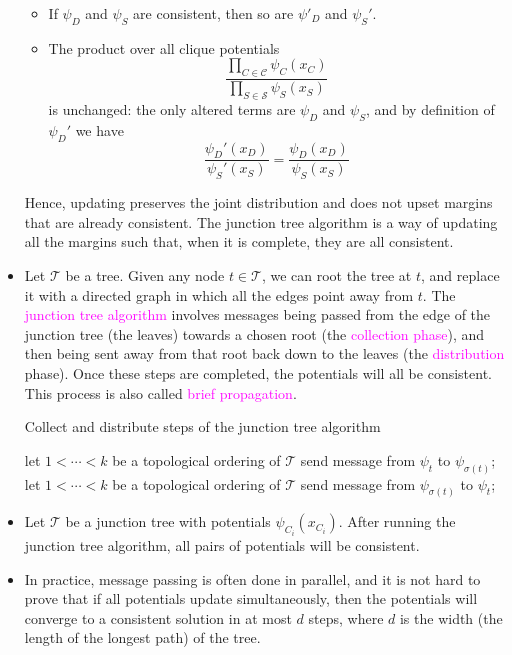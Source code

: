 \documentclass[UTF8]{book}
\newcommand{\concept}[1]{\textcolor{magenta}{#1}}
\begin{document}
\begin{itemize}
\begin{itemize}
	\item If $\psi_D$ and $\psi_S$ are consistent, then so are $\psi'_D$ and $\psi_S'$.
	\item The product over all clique potentials
	$$
		\dfrac{\prod_{C\in \mathcal{C}}\psi_C(x_C)}{\prod_{S\in \mathcal{S}}\psi_S(x_S)}	
	$$
	is unchanged: the only altered terms are $\psi_D$ and $\psi_S$, and by definition of $\psi_D'$ we have
	$$
		\dfrac{\psi_D'(x_D)}{\psi_S'(x_S)} = \dfrac{\psi_D(x_D)}{\psi_S(x_S)}	
	$$
\end{itemize}
Hence, updating preserves the joint distribution and does not upset margins that are already consistent. The junction tree algorithm is a way of updating all the margins such that, when it is complete, they are all consistent.
\item Let $\mathcal{T}$ be a tree. Given any node $t\in\mathcal{T}$, we can root the tree at $t$, and replace it with a directed graph in which all the edges point away from $t$. The \concept{junction tree algorithm} involves messages being passed from the edge of the junction tree (the leaves) towards a chosen root (the \concept{collection phase}), and then being sent away from that root back down to the leaves (the \concept{distribution} phase). Once these steps are completed, the potentials will all be consistent. This process is also called \concept{brief propagation}.
\begin{algorithm}
\caption{Collect and distribute steps of the junction tree algorithm}
\begin{algorithmic}
\State let $1<\cdots <k$ be a topological ordering of $\mathcal{T}$
    \State send message from $\psi_t$ to $\psi_{\sigma(t)}$;
\EndFor
\State {}
\EndFunction
{}
\State let $1<\cdots <k$ be a topological ordering of $\mathcal{T}$
    \State send message from $\psi_{\sigma(t)}$ to $\psi_t$;
\EndFor
\State {}
\EndFunction
\end{algorithmic}
\end{algorithm}
\item Let $\mathcal{T}$ be a junction tree with potentials $\psi_{C_i}(x_{C_i})$. After running the junction tree algorithm, all pairs of potentials will be consistent.
\item In practice, message passing is often done in parallel, and it is not hard to prove that if all potentials update simultaneously, then the potentials will converge to a consistent solution in at most $d$ steps, where $d$ is the width (the length of the longest path) of the tree.

\end{itemize}
\end{document}
